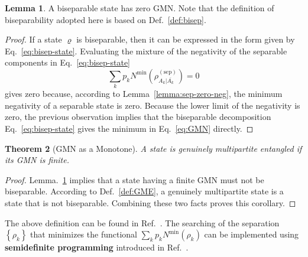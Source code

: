 \documentclass[12font]{article}
\numberwithin{equation}{section}    %
\newtheorem{theorem}{Theorem}[section]
\theoremstyle{definition}
\newtheorem{lemma}[theorem]{Lemma}
\newcommand{\lr}[1]{\left(  #1  \right)}
\newcommand{\lrg}[1]{\left\{  #1  \right\}}
\newcommand{\mrm}[1]{\mathrm{#1}}
\begin{document}
\begin{lemma}\label{lemma:bisep-zero-GMN}
    A biseparable state has zero GMN. Note that the definition of biseparability adopted here is based on Def.~\ref{def:bisep}.
\end{lemma}
\begin{proof}
    If a state $\varrho$ is biseparable, then it can be expressed in the form given by Eq.~\ref{eq:bisep-state}. Evaluating the mixture of the negativity of the separable components in Eq.~\eqref{eq:bisep-state} 
    \[
    \sum_{k}p_k N^{\mrm{min}} \lr{\rho^{(\mrm{sep})}_{A_k|\overline{A_k}}}
    =
    0
    \]
    gives zero because, according to Lemma~\ref{lemma:sep-zero-neg}, the minimum negativity of a separable state is zero. Because the lower limit of the negativity is zero, the previous observation implies that the biseparable decomposition Eq.~\eqref{eq:bisep-state} gives the minimum in Eq.~\eqref{eq:GMN} directly. 
\end{proof}

\begin{theorem}[GMN as a Monotone]
    A state is genuinely multipartite entangled if its GMN is finite.
\end{theorem}
\begin{proof}
    Lemma.~\ref{lemma:bisep-zero-GMN} implies that a state having a finite GMN must not be biseparable. According to Def.~\ref{def:GME}, a genuinely multipartite state is a state that is not biseparable. Combining these two facts proves this corollary.
\end{proof}

The above definition can be found in Ref.~\cite{Lyu-Chandorkar-Kapoor-Takei-Sorensen-Witczak-Krempa_2026}. The searching of the separation $\lrg{\rho_k}$ that minimizes the functional $\sum_{k}p_k N^{\mrm{min}}(\rho_k)$ can be implemented using \textbf{semidefinite programming} introduced in Ref.~\cite{Jungnitsch-Moroder-Guhne_2011, Hofmann-Moroder-Guhne_2014}.
\end{document}
